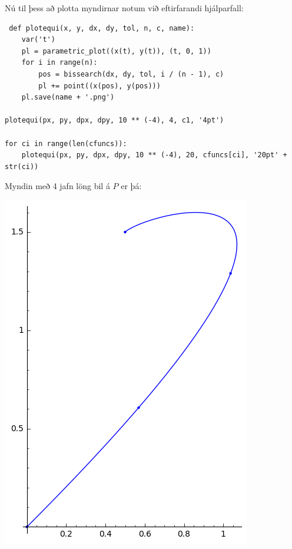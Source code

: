 \documentclass{article}
\begin{document}
\vspace*{0.5cm}

Nú til þess að plotta myndirnar notum við eftirfarandi hjálparfall: \\

\begin{verbatim}
 def plotequi(x, y, dx, dy, tol, n, c, name):
    var('t')
    pl = parametric_plot((x(t), y(t)), (t, 0, 1))
    for i in range(n):
        pos = bissearch(dx, dy, tol, i / (n - 1), c)
        pl += point((x(pos), y(pos)))
    pl.save(name + '.png')
    
plotequi(px, py, dpx, dpy, 10 ** (-4), 4, c1, '4pt')

for ci in range(len(cfuncs)):
    plotequi(px, py, dpx, dpy, 10 ** (-4), 20, cfuncs[ci], '20pt' + str(ci))
\end{verbatim}

\vspace*{0.5cm}

Myndin með 4 jafn löng bil á $P$ er þá: \\

\begin{center}
\includegraphics[scale=0.75]{4pt}
\end{center}
\end{document}
